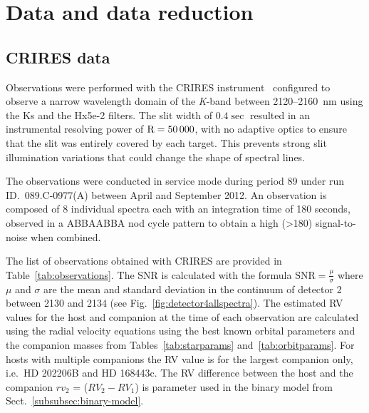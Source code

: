 \documentclass[fleqn,usenatbib]{mnras}
\begin{document}
    
    
    
    
    
    \section{Data and data reduction}
    \label{sec:data}
    
    \subsection{CRIRES data}
    \label{subsec:CRIRES}
    Observations were performed with the CRIRES instrument~\citep{kaeufl_crires_2004} configured to observe a narrow wavelength domain of the \textit{K}-band between 2120--2160~nm using the {Ks} and the {Hx5e-2} filters. The slit width of \(0.4\sec\) resulted in an instrumental resolving power of \(\rm R=50\,000\), with no adaptive optics to ensure that the slit was entirely covered by each target. This prevents strong slit illumination variations that could change the shape of spectral lines.
    
    The observations were conducted in service mode during period 89 under run ID.~089.C-0977(A) between April and September 2012. An observation is composed of 8 individual spectra each with an integration time of 180 seconds, observed in a ABBAABBA nod cycle pattern to obtain a high (>180) signal-to-noise when combined.
    
    {The list of observations obtained with CRIRES are provided in Table~\ref{tab:observations}. The SNR is calculated with the formula \(\textrm{SNR} = \frac{\mu}{\sigma}\) where $\mu$ and $\sigma$ are the mean and standard deviation in the continuum of detector 2 between 2130 and 2134 (see Fig.~\ref{fig:detector4allspectra}).
    The estimated RV values for the host and companion at the time of each observation are calculated using the radial velocity equations using the best known orbital parameters and the companion masses from Tables~\ref{tab:starparams} and~\ref{tab:orbitparams}. For hosts with multiple companions the RV value is for the largest companion only, i.e.\ {HD 202206}B and {HD 168443}c. The RV difference between the host and the companion \(rv_2\) = (\(RV_2 - RV_1\)) is parameter used in the binary model from Sect.~\ref{subsubsec:binary-model}. }
    
    
    
\end{document}
